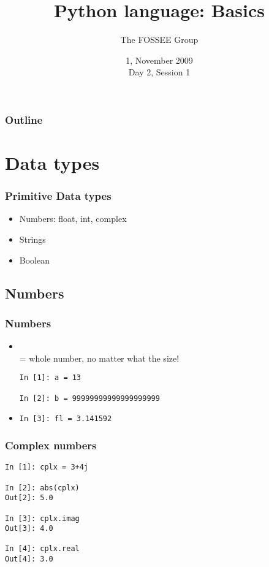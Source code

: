\documentclass[14pt,compress]{beamer}
\title[Basic Python]{Python language: Basics}
\author[FOSSEE Team] {The FOSSEE Group}
\institute[IIT Bombay] {Department of Aerospace Engineering\\IIT Bombay}
\date[] {1, November 2009\\Day 2, Session 1}
\newcommand{\kwrd}[1]{ \texttt{\textbf{\color{blue}{#1}}}  }
\begin{document}
\begin{frame}
  \titlepage
\end{frame}

\begin{frame}
  \frametitle{Outline}
  \tableofcontents
\end{frame}

\section{Data types}

\begin{frame}
  \frametitle{Primitive Data types}
  \begin{itemize}
    \item Numbers: float, int, complex
    \item Strings
    \item Boolean
  \end{itemize}
\end{frame}

\subsection{Numbers}
\begin{frame}[fragile]
  \frametitle{Numbers}
  \begin{itemize}
    \item \kwrd{int}\\ \kwrd{int} = whole number, no matter what the size!
  \begin{lstlisting}
In [1]: a = 13

In [2]: b = 99999999999999999999
  \end{lstlisting}
    \item \kwrd{float}
  \begin{lstlisting}
In [3]: fl = 3.141592
  \end{lstlisting}
  \end{itemize}
\end{frame}

\begin{frame}[fragile]
\frametitle{Complex numbers}
  \begin{lstlisting}
In [1]: cplx = 3+4j

In [2]: abs(cplx)
Out[2]: 5.0

In [3]: cplx.imag
Out[3]: 4.0

In [4]: cplx.real
Out[4]: 3.0
  \end{lstlisting}
\end{frame}
\end{document}
